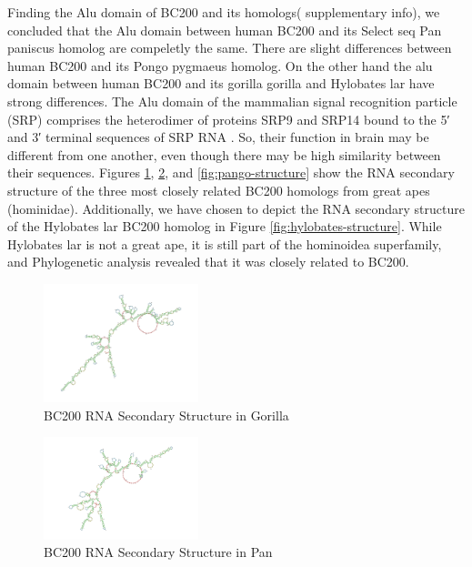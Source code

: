 \documentclass[conference]{IEEEtran}
\begin{document}
Finding the Alu domain of BC200 and its homologs( supplementary info), we concluded that the Alu domain between human BC200 and its Select seq Pan paniscus homolog are compeletly the same. There are slight differences between human BC200 and its Pongo pygmaeus homolog. On the other hand the alu domain between human BC200 and its gorilla gorilla and Hylobates lar have strong differences.
The Alu domain of the mammalian signal recognition particle (SRP) comprises the heterodimer of proteins SRP9 and SRP14 bound to the 5′ and 3′ terminal sequences of SRP RNA \cite{weichenrieder2000structure}. 
So, their function in brain may be different from one another, even though there may be high similarity between their sequences. 
Figures \ref{fig:gorilla-structure}, \ref{fig:pan-structure}, and \ref{fig:pango-structure} show the RNA secondary structure of the three most closely related BC200 homologs from great apes (hominidae). 
Additionally, we have chosen to depict the RNA secondary structure of the Hylobates lar BC200 homolog in Figure \ref{fig:hylobates-structure}. 
While Hylobates lar is not a great ape, it is still part of the hominoidea superfamily, and Phylogenetic analysis revealed that it was closely related to BC200.

\begin{figure}[h]
  \centering
  \includegraphics[width=0.4\textwidth]{figs/rnagorilla.png}
  \caption{BC200 RNA Secondary Structure in Gorilla}
  \label{fig:gorilla-structure}
\end{figure}

\begin{figure}[h]
  \centering
  \includegraphics[width=0.4\textwidth]{figs/rnapan.png}
  \caption{BC200 RNA Secondary Structure in Pan}
  \label{fig:pan-structure}
\end{figure}
\end{document}
